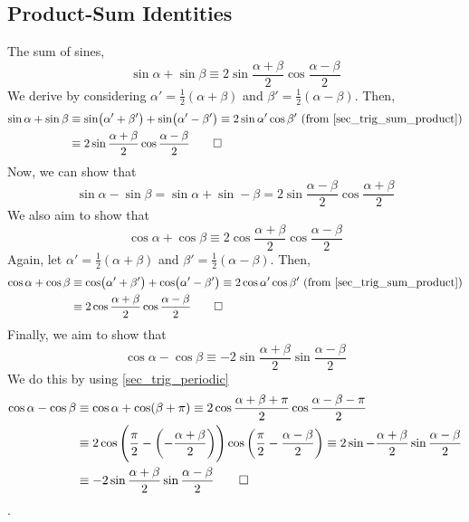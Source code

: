 \documentclass[fleqn,a4paper,11pt]{article}
\begin{document}
    \subsection{Product-Sum Identities}


    The sum of sines,
    \begin{equation}
    \sin \alpha + \sin \beta \equiv
        2 \sin \frac{\alpha + \beta}2 \cos \frac{\alpha - \beta}2
    \end{equation}
    We derive by considering \(\alpha' = \frac 12 (\alpha + \beta)\) and
    \(\beta' = \frac 12 (\alpha - \beta)\). Then,
    \begin{align*}
    \sin \alpha + \sin \beta &\equiv
     \sin(\alpha' + \beta') + \sin(\alpha' - \beta') \equiv
     2\sin \alpha' \cos \beta'\ \text{(from \ref{sec_trig_sum_product})}
    \\&\equiv 2 \sin \frac{\alpha + \beta}2 \cos \frac{\alpha - \beta} 2 \qed
    \end{align*}
    Now, we can show that
    \begin{equation}
    \sin \alpha - \sin \beta =
        \sin \alpha + \sin -\beta =
        2 \sin \frac{\alpha - \beta} 2 \cos\frac{\alpha + \beta} 2
    \end{equation}
    We also aim to show that
    \begin{equation}
    \cos \alpha + \cos \beta \equiv
        2 \cos\frac{\alpha + \beta} 2 \cos \frac{\alpha - \beta} 2
    \end{equation}
    Again, let \(\alpha' = \frac 12 (\alpha + \beta)\) and
    \(\beta' = \frac 12 (\alpha - \beta)\). Then,
    \begin{align*}
     \cos \alpha + \cos \beta &\equiv
     \cos(\alpha' + \beta') + \cos(\alpha' - \beta') \equiv
     2\cos \alpha' \cos \beta'\ \text{(from \ref{sec_trig_sum_product})}
     \\&\equiv 2 \cos\frac{\alpha + \beta} 2 \cos \frac{\alpha - \beta} 2 \qed
    \end{align*}
    Finally, we aim to show that
    \begin{equation}
    \cos \alpha - \cos \beta \equiv
     -2 \sin \frac{\alpha + \beta} 2 \sin \frac{\alpha - \beta} 2
    \end{equation}
    We do this by using \ref{sec_trig_periodic}
    \begin{align*}
     \cos \alpha - \cos \beta &\equiv
     \cos \alpha + \cos (\beta + \pi)  \equiv
     2 \cos \frac{\alpha + \beta + \pi} 2 \cos \frac {\alpha - \beta - \pi} 2
     \\&\equiv
     2 \cos \pqty{\frac \pi 2 - \pqty{-\frac{\alpha + \beta} 2}}
       \cos \pqty{\frac \pi 2 - \frac{\alpha - \beta} 2} \equiv
     2 \sin -\frac{\alpha + \beta} 2 \sin \frac{\alpha - \beta} 2 \\&\equiv
     -2 \sin \frac{\alpha + \beta} 2 \sin \frac{\alpha - \beta} 2 \qed
    \end{align*}.
\end{document}
